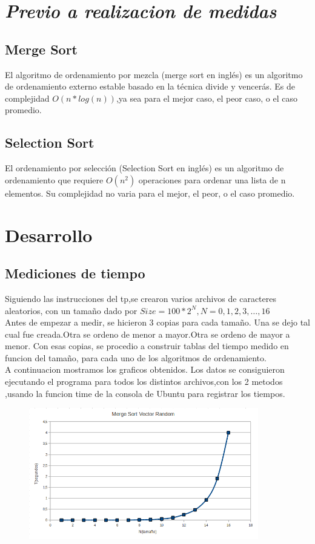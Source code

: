 \section{\emph{Previo a realizacion de medidas}}
\subsection{Merge Sort}
El algoritmo de ordenamiento por mezcla (merge sort en inglés) es un algoritmo de ordenamiento externo estable basado en la técnica divide y vencerás.
Es de complejidad $O(n*log(n))$,ya sea para el mejor caso, el peor caso, o el caso promedio.

\subsection{Selection Sort}
El ordenamiento por selección (Selection Sort en inglés) es un algoritmo de ordenamiento que requiere $O(n^2)$ operaciones para ordenar una lista de n elementos.
Su complejidad no varia para el mejor, el peor, o el caso promedio.

\newpage

\section{Desarrollo}
\subsection{Mediciones de tiempo}
Siguiendo las instrucciones del tp,se crearon varios archivos de caracteres aleatorios, 
con un tamaño dado por $Size = 100*2^N , N=0,1,2,3, \dots ,16$
\\Antes de empezar a medir, se hicieron 3 copias para cada tamaño.
Una se dejo tal cual fue creada.Otra se ordeno de menor a mayor.Otra se ordeno de mayor a menor.
Con esas copias, se procedio a construir tablas del tiempo medido en funcion del tamaño, para cada uno
de los algoritmos de ordenamiento.\\
A continuacion mostramos los graficos obtenidos.
Los datos se consiguieron ejecutando el programa para todos los distintos archivos,con los 2 metodos
,usando la funcion time de la consola de Ubuntu para registrar los tiempos.
\begin{figure}[!htp]
\begin{center}
\includegraphics[width=10cm]{Imagenes/MergeSortVectorRandom.PNG}
\end{center}
\end{figure} 

